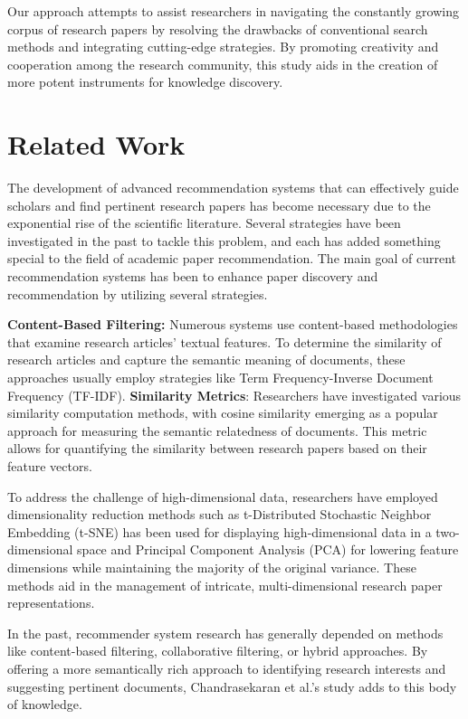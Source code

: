 \documentclass[runningheads]{llncs}
\begin{document}
Our approach attempts to assist researchers in navigating the constantly growing corpus of research papers by resolving the drawbacks of conventional search methods and integrating cutting-edge strategies. By promoting creativity and cooperation among the research community, this study aids in the creation of more potent instruments for knowledge discovery.

\section{\textbf{Related Work}}
The development of advanced recommendation systems that can effectively guide scholars and find pertinent research papers has become necessary due to the exponential rise of the scientific literature. Several strategies have been investigated in the past to tackle this problem, and each has added something special to the field of academic paper recommendation.
The main goal of current recommendation systems \cite{r2} has been to enhance paper discovery and recommendation by utilizing several strategies.

\textbf{Content-Based Filtering:} Numerous systems use content-based methodologies that examine research articles' textual features. To determine the similarity of research articles and capture the semantic meaning of documents, these approaches usually employ strategies like Term Frequency-Inverse Document Frequency (TF-IDF).
\newline
\textbf{Similarity Metrics}: Researchers have investigated various similarity computation methods, with cosine similarity emerging as a popular approach for measuring the semantic relatedness of documents. This metric allows for quantifying the similarity between research papers based on their feature vectors.

To address the challenge of high-dimensional data, researchers have employed dimensionality reduction methods such as t-Distributed Stochastic Neighbor Embedding (t-SNE) has been used for displaying high-dimensional data in a two-dimensional space and Principal Component Analysis (PCA) for lowering feature dimensions while maintaining the majority of the original variance.
These methods aid in the management of intricate, multi-dimensional research paper representations.

In the past, recommender system research has generally depended on methods like content-based filtering, collaborative filtering, or hybrid approaches. By offering a more semantically rich approach to identifying research interests and suggesting pertinent documents, Chandrasekaran et al\cite{r1}.'s study adds to this body of knowledge.
\end{document}
